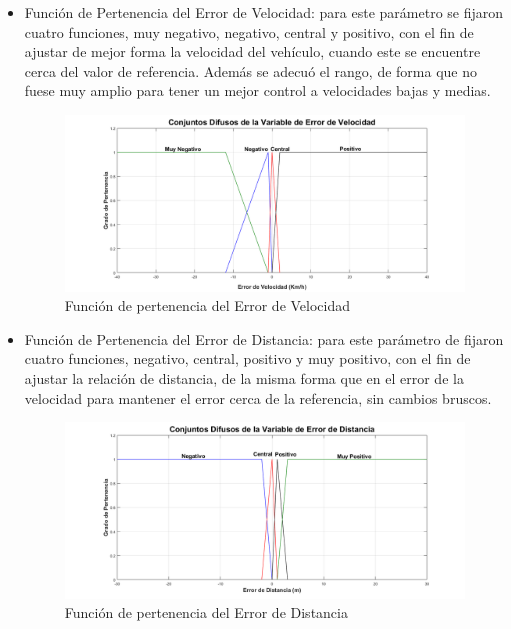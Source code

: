 \begin{itemize}

\item Función de Pertenencia del Error de Velocidad: para este parámetro se fijaron cuatro funciones, muy negativo, negativo, central y positivo, con el fin de ajustar de mejor forma la velocidad del vehículo, cuando este se encuentre cerca del valor de referencia. Además se adecuó el rango, de forma que no fuese muy amplio para tener un mejor control a velocidades bajas y medias. 

\begin{figure}[!h]
	\centering
		\includegraphics[scale=0.35]{Imagenes/fuzzyvel}
		\caption{Función de pertenencia del Error de Velocidad}
		\label{fig:fuzzyvel}
\end{figure}	 

\item Función de Pertenencia del Error de Distancia: para este parámetro de fijaron cuatro funciones, negativo, central, positivo y muy positivo, con el fin de ajustar la relación de distancia, de la misma forma que en el error de la velocidad para mantener el error cerca de la referencia, sin cambios bruscos.

\begin{figure}[!h]
	\centering
		\includegraphics[scale=0.35]{Imagenes/fuzzydist}
		\caption{Función de pertenencia del Error de Distancia}
		\label{fig:fuzzydist}
\end{figure}	 

\end{itemize}
   
